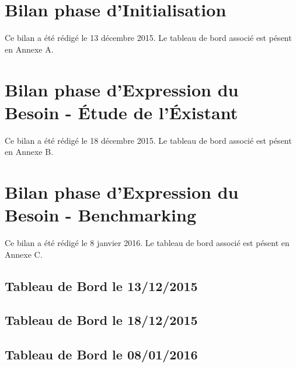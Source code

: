 

\newcommand{\mainTitle}{\'Etude préalable - SPIE}
\newcommand{\secondTitle}{Document de suivi}
\newcommand{\documentRef}{TB/4401/1}




\newpage

\tableofcontents
\listoffigures
\listoftables
\newpage


\part{Bilan phase d'Initialisation}

Ce bilan a été rédigé le 13 décembre 2015. Le tableau de bord associé est pésent en Annexe A.

\setcounter{section}{0}


\part{Bilan phase d'Expression du Besoin - \'Etude de l'\'Existant}

Ce bilan a été rédigé le 18 décembre 2015. Le tableau de bord associé est pésent en Annexe B.

\setcounter{section}{0}


\part{Bilan phase d'Expression du Besoin - Benchmarking}

Ce bilan a été rédigé le 8 janvier 2016. Le tableau de bord associé est pésent en Annexe C.

\setcounter{section}{0}



\begin{appendices}

\chapter{Tableau de Bord le 13/12/2015}


\chapter{Tableau de Bord le 18/12/2015}


\chapter{Tableau de Bord le 08/01/2016}


\end{appendices}


